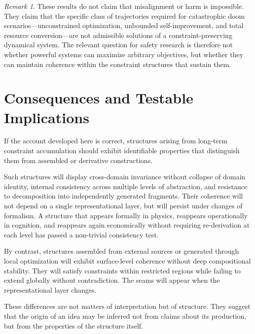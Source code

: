\documentclass[11pt]{article}
\theoremstyle{plain}
\theoremstyle{definition}
\theoremstyle{remark}
\newtheorem{remark}[theorem]{Remark}
\begin{document}
\begin{remark}
These results do not claim that misalignment or harm is impossible.
They claim that the specific class of trajectories required for
catastrophic doom scenarios---unconstrained optimization, unbounded
self-improvement, and total resource conversion---are not admissible
solutions of a constraint-preserving dynamical system. The relevant
question for safety research is therefore not whether powerful systems
can maximize arbitrary objectives, but whether they can maintain
coherence within the constraint structures that sustain them.
\end{remark}


\section{Consequences and Testable Implications}

If the account developed here is correct, structures arising from long-term
constraint accumulation should exhibit identifiable properties that
distinguish them from assembled or derivative constructions.

Such structures will display cross-domain invariance without collapse of
domain identity, internal consistency across multiple levels of abstraction,
and resistance to decomposition into independently generated fragments.
Their coherence will not depend on a single representational layer, but
will persist under changes of formalism. A structure that appears formally
in physics, reappears operationally in cognition, and reappears again
economically without requiring re-derivation at each level has passed a
non-trivial consistency test.

By contrast, structures assembled from external sources or generated through
local optimization will exhibit surface-level coherence without deep
compositional stability. They will satisfy constraints within restricted
regions while failing to extend globally without contradiction. The seams
will appear when the representational layer changes.

These differences are not matters of interpretation but of structure.
They suggest that the origin of an idea may be inferred not from claims
about its production, but from the properties of the structure itself.
\end{document}
